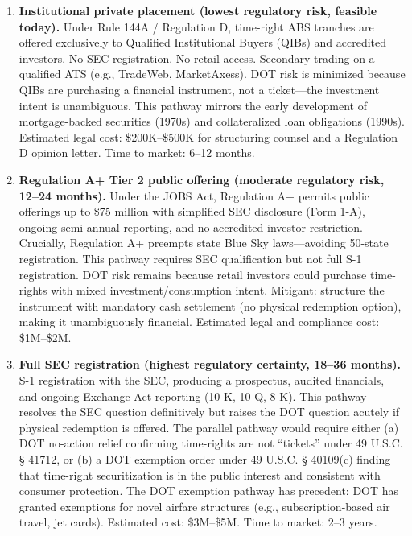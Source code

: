 \documentclass[12pt,a4paper]{article}
\begin{document}
\begin{enumerate}[label=\textbf{Tier \arabic*}, leftmargin=*]
    \item \textbf{Institutional private placement (lowest regulatory risk, feasible today).} Under Rule 144A / Regulation D, time-right ABS tranches are offered exclusively to Qualified Institutional Buyers (QIBs) and accredited investors. No SEC registration. No retail access. Secondary trading on a qualified ATS (e.g., TradeWeb, MarketAxess). DOT risk is minimized because QIBs are purchasing a financial instrument, not a ticket---the investment intent is unambiguous. This pathway mirrors the early development of mortgage-backed securities (1970s) and collateralized loan obligations (1990s). Estimated legal cost: \$200K--\$500K for structuring counsel and a Regulation D opinion letter. Time to market: 6--12 months.
    \item \textbf{Regulation A+ Tier 2 public offering (moderate regulatory risk, 12--24 months).} Under the JOBS Act, Regulation A+ permits public offerings up to \$75 million with simplified SEC disclosure (Form 1-A), ongoing semi-annual reporting, and no accredited-investor restriction. Crucially, Regulation A+ preempts state Blue Sky laws---avoiding 50-state registration. This pathway requires SEC qualification but not full S-1 registration. DOT risk remains because retail investors could purchase time-rights with mixed investment/consumption intent. Mitigant: structure the instrument with mandatory cash settlement (no physical redemption option), making it unambiguously financial. Estimated legal and compliance cost: \$1M--\$2M.
    \item \textbf{Full SEC registration (highest regulatory certainty, 18--36 months).} S-1 registration with the SEC, producing a prospectus, audited financials, and ongoing Exchange Act reporting (10-K, 10-Q, 8-K). This pathway resolves the SEC question definitively but raises the DOT question acutely if physical redemption is offered. The parallel pathway would require either (a) DOT no-action relief confirming time-rights are not ``tickets'' under 49 U.S.C. § 41712, or (b) a DOT exemption order under 49 U.S.C. § 40109(c) finding that time-right securitization is in the public interest and consistent with consumer protection. The DOT exemption pathway has precedent: DOT has granted exemptions for novel airfare structures (e.g., subscription-based air travel, jet cards). Estimated cost: \$3M--\$5M. Time to market: 2--3 years.
\end{enumerate}
\end{document}

